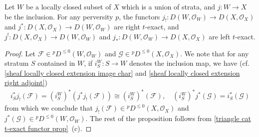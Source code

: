 \begin{proposition}\label{triangle cat perverse t-structure t-exactness}
Let $W$ be a locally closed subset of $X$ which is a union of strata, and $j:W\to X$ be the inclusion. For any perversity $p$, the functors $j_!:D(W,\mathscr{O}_W)\to D(X,\mathscr{O}_X)$ and $j^*:D(X,\mathscr{O}_X)\to D(W,\mathscr{O}_W)$ are right $t$-exact, and $j^!:D(X,\mathscr{O}_X)\to D(W,\mathscr{O}_W)$ and $j_*:D(W,\mathscr{O}_W)\to D(X,\mathscr{O}_X)$ are left $t$-exact.
\end{proposition}
\begin{proof}
Let $\mathscr{F}\in {^pD^{\leq 0}}(W,\mathscr{O}_W)$ and $\mathscr{G}\in {^pD^{\leq 0}}(X,\mathscr{O}_X)$. We note that for any stratum $S$ contained in $W$, if $i_S^W:S\to W$ denotes the inclusion map, we have (cf. \cref{sheaf locally closed extension image char} and \cref{sheaf locally closed extension right adjoint})
\begin{align*}
i_S^*j_!(\mathscr{F})=(i_S^W)^*(j^*j_!(\mathscr{F}))\cong (i_S^W)^*(\mathscr{F}),\quad (i_S^W)^*j^*(\mathscr{G})=i_S^*(\mathscr{G})
\end{align*}
from which we conclude that $j_!(\mathscr{F})\in {^pD^{\leq 0}}(X,\mathscr{O}_X)$ and $j^*(\mathscr{G})\in {^pD^{\leq 0}}(W,\mathscr{O}_W)$. The rest of the proposition follows from \cref{triangle cat t-exact functor prop}~(c).
\end{proof}

